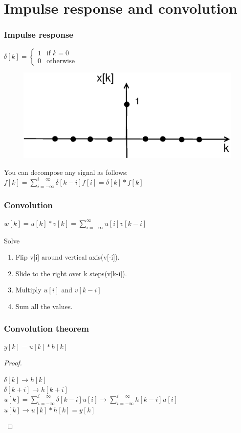 \section{Impulse response and convolution}
\begin{frame}
	\frametitle{Impulse response}
	
	\begin{definition}
		\footnotesize{
		$\delta[k]=
		\begin{cases} 
			1 & \text{if } k = 0 \\ 
			0 & \mbox{otherwise}  
		\end{cases}$}
	\end{definition}
	\vspace{-1em}
		\begin{figure}
			\centering
			\includegraphics[width=0.45\linewidth]{Images/Discrete_time_eps_8.eps}
		\end{figure}
		\vspace{-1em}
\begin{theorem}
	\scriptsize{
	You can decompose any signal as follows:\\
	$f[k]=\sum\limits_{i=-\infty}^{i=\infty}\delta[k-i]f[i] = \delta[k] \ast f[k]$}
\end{theorem}
\end{frame}
\begin{frame}
	\frametitle{Convolution}
	\begin{definition}
		$w[k]=u[k]\ast v[k] = \sum\limits_{i=-\infty}^{\infty} u[i]v[k-i]$
	\end{definition}
	\begin{block}{Solve}
		\begin{enumerate}
			\item Flip v[i] around vertical axis(v[-i]).
			\item Slide to the right over k steps(v[k-i]).
			\item Multiply $u[i]$ and $v[k-i]$
			\item Sum all the values.
		\end{enumerate}
	\end{block}
\end{frame}
\begin{frame}
	\frametitle{Convolution theorem }
	\begin{theorem}
		$y[k] = u[k] \ast h[k]$
	\end{theorem}
	\begin{proof}
		\begin{center}
				$ \delta[k] \rightarrow h[k]$\\
				$ \delta[k+i] \rightarrow h[k+i]$\\
				$ u[k] = \sum\limits_{i=-\infty}^{i=\infty}\delta[k-i]u[i] \rightarrow \sum\limits_{i=-\infty}^{i=\infty}h[k-i]u[i]$\\
				$u[k] \rightarrow u[k] \ast h[k] = y[k] $
		\end{center}
	\end{proof}
\end{frame}
